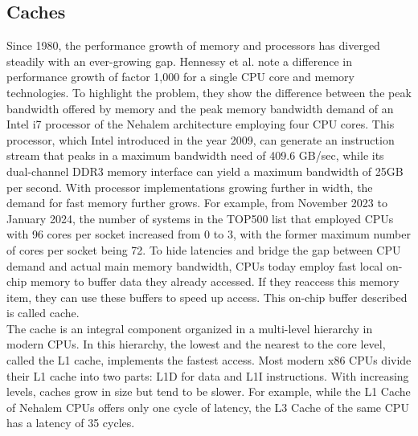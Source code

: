 \subsection{Caches}
\label{sec:state:technical:caches}
Since 1980, the performance growth of memory and processors has diverged
steadily with an ever-growing gap. Hennessy et al. note a difference in
performance growth of factor 1,000 for a single CPU core and memory
technologies. To highlight the problem, they show the difference between the
peak bandwidth offered by memory and the peak memory bandwidth demand of an
Intel i7 processor of the Nehalem architecture employing four CPU cores. This
processor, which Intel introduced in the year 2009, can generate an instruction
stream that peaks in a maximum bandwidth need of 409.6 GB/sec, while its
dual-channel DDR3 memory interface can yield a maximum bandwidth of 25GB per
second.\cite{hennessy2011computer} With processor implementations growing
further in width, the demand for fast memory further grows. For example, from
November 2023 to January 2024, the number of systems in the TOP500 list that
employed CPUs with 96 cores per socket increased from 0 to 3, with the former
maximum number of cores per socket being 72.\cite{top500} To hide latencies and
bridge the gap between CPU demand and actual main memory bandwidth, CPUs today
employ fast local on-chip memory to buffer data they already accessed. If they
reaccess this memory item, they can use these buffers to speed up access. This
on-chip buffer described is called cache.\\

The cache is an integral component organized in a multi-level hierarchy in
modern CPUs. In this hierarchy, the lowest and the nearest to the core level,
called the L1 cache, implements the fastest access. Most modern x86 CPUs divide
their L1 cache into two parts: L1D for data and L1I instructions. With
increasing levels, caches grow in size but tend to be slower. For example, while
the L1 Cache of Nehalem CPUs offers only one cycle of latency, the L3 Cache of
the same CPU has a latency of 35 cycles.\cite{hennessy2011computer}\\

